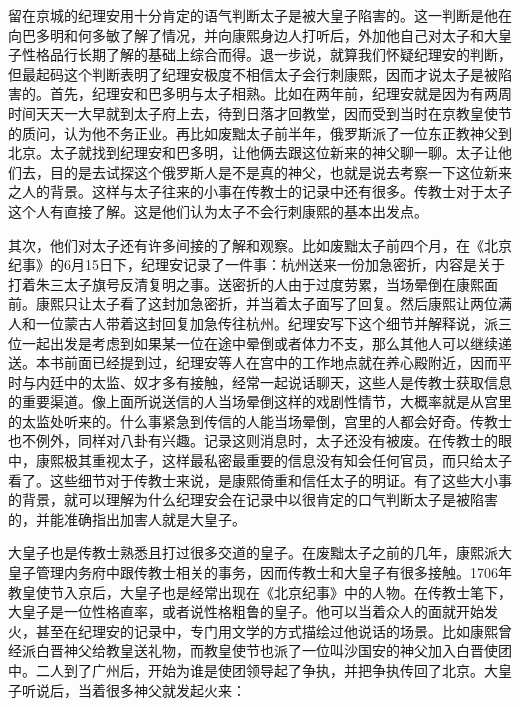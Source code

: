 
留在京城的纪理安用十分肯定的语气判断太子是被大皇子陷害的。这一判断是他在向巴多明和何多敏了解了情况，并向康熙身边人打听后，外加他自己对太子和大皇子性格品行长期了解的基础上综合而得。退一步说，就算我们怀疑纪理安的判断，但最起码这个判断表明了纪理安极度不相信太子会行刺康熙，因而才说太子是被陷害的。首先，纪理安和巴多明与太子相熟。比如在两年前，纪理安就是因为有两周时间天天一大早就到太子府上去，待到日落才回教堂，因而受到当时在京教皇使节的质问，认为他不务正业。再比如废黜太子前半年，俄罗斯派了一位东正教神父到北京。太子就找到纪理安和巴多明，让他俩去跟这位新来的神父聊一聊。太子让他们去，目的是去试探这个俄罗斯人是不是真的神父，也就是说去考察一下这位新来之人的背景。这样与太子往来的小事在传教士的记录中还有很多。传教士对于太子这个人有直接了解。这是他们认为太子不会行刺康熙的基本出发点。



其次，他们对太子还有许多间接的了解和观察。比如废黜太子前四个月，在《北京纪事》的6月15日下，纪理安记录了一件事：杭州送来一份加急密折，内容是关于打着朱三太子旗号反清复明之事。送密折的人由于过度劳累，当场晕倒在康熙面前。康熙只让太子看了这封加急密折，并当着太子面写了回复。然后康熙让两位满人和一位蒙古人带着这封回复加急传往杭州。纪理安写下这个细节并解释说，派三位一起出发是考虑到如果某一位在途中晕倒或者体力不支，那么其他人可以继续递送。本书前面已经提到过，纪理安等人在宫中的工作地点就在养心殿附近，因而平时与内廷中的太监、奴才多有接触，经常一起说话聊天，这些人是传教士获取信息的重要渠道。像上面所说送信的人当场晕倒这样的戏剧性情节，大概率就是从宫里的太监处听来的。什么事紧急到传信的人能当场晕倒，宫里的人都会好奇。传教士也不例外，同样对八卦有兴趣。记录这则消息时，太子还没有被废。在传教士的眼中，康熙极其重视太子，这样最私密最重要的信息没有知会任何官员，而只给太子看了。这些细节对于传教士来说，是康熙倚重和信任太子的明证。有了这些大小事的背景，就可以理解为什么纪理安会在记录中以很肯定的口气判断太子是被陷害的，并能准确指出加害人就是大皇子。



大皇子也是传教士熟悉且打过很多交道的皇子。在废黜太子之前的几年，康熙派大皇子管理内务府中跟传教士相关的事务，因而传教士和大皇子有很多接触。1706年教皇使节入京后，大皇子也是经常出现在《北京纪事》中的人物。在传教士笔下，大皇子是一位性格直率，或者说性格粗鲁的皇子。他可以当着众人的面就开始发火，甚至在纪理安的记录中，专门用文学的方式描绘过他说话的场景。比如康熙曾经派白晋神父给教皇送礼物，而教皇使节也派了一位叫沙国安的神父加入白晋使团中。二人到了广州后，开始为谁是使团领导起了争执，并把争执传回了北京。大皇子听说后，当着很多神父就发起火来：


